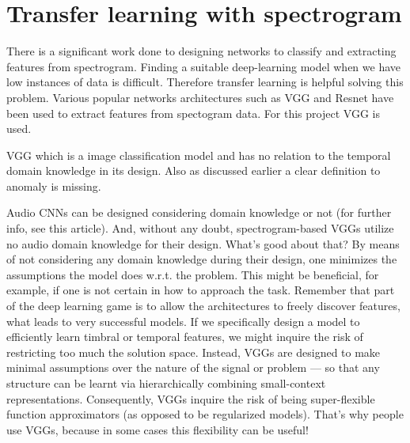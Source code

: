    
   \section{Transfer learning with spectrogram}   
  There is a significant work done to designing networks to classify and extracting features from spectrogram. Finding a suitable deep-learning model when we have low instances of data is difficult. Therefore transfer learning is helpful solving this problem. Various popular networks architectures such as VGG and Resnet have been used to extract features from spectogram data. For this project VGG is used. 
  
  VGG which is a image classification model and has no relation to the temporal domain knowledge in its design. Also as discussed earlier a clear definition to anomaly is missing. 
  
  
  
  Audio CNNs can be designed considering domain knowledge or not (for further info, see this article). And, without any doubt, spectrogram-based VGGs utilize no audio domain knowledge for their design. What’s good about that?
  By means of not considering any domain knowledge during their design, one minimizes the assumptions the model does w.r.t. the problem. This might be beneficial, for example, if one is not certain in how to approach the task.
  Remember that part of the deep learning game is to allow the architectures to freely discover features, what leads to very successful models. If we specifically design a model to efficiently learn timbral or temporal features, we might inquire the risk of restricting too much the solution space.
  Instead, VGGs are designed to make minimal assumptions over the nature of the signal or problem — so that any structure can be learnt via hierarchically combining small-context representations. Consequently, VGGs inquire the risk of being super-flexible function approximators (as opposed to be regularized models). That’s why people use VGGs, because in some cases this flexibility can be useful! 

